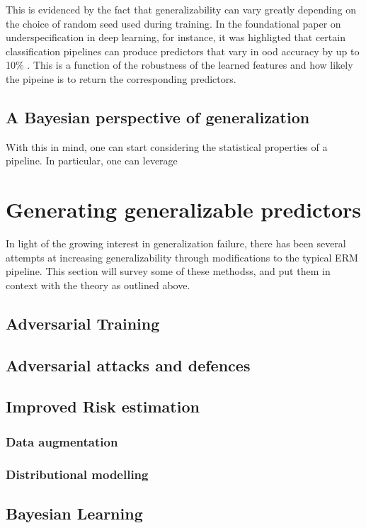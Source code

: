 		This is evidenced by the fact that generalizability can vary greatly depending on the choice of random seed used during training. In the foundational paper on underspecification in deep learning, for instance, it was highligted that certain classification pipelines can produce predictors that vary in ood accuracy by up to 10\% \cite{damour2020underspecification}. This is a function of the robustness of the learned features and how likely the pipeine is to return the corresponding predictors. 

	\subsection{A Bayesian perspective of generalization}
		With this in mind, one can start considering the statistical properties of a pipeline. In particular, one can leverage 
\section{Generating generalizable predictors}
	In light of the growing interest in generalization failure, there has been several attempts at increasing generalizability through modifications to the typical ERM pipeline. This section will survey some of these methodss, and put them in context with the theory as outlined above. 
	\subsection{Adversarial Training}
		\subsection{Adversarial attacks and defences}
	\subsection{Improved Risk estimation}
		\subsubsection{Data augmentation}
		\subsubsection{Distributional modelling}
	\subsection{Bayesian Learning}
	

